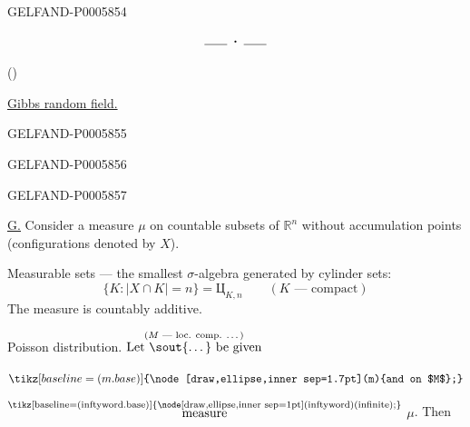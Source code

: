 \begin{GelfandAdjacentEvidence}{GELFAND-P000585}{4}

\[
\rule{1.8em}{.4pt}\;\boldsymbol{\cdot}\;\rule{1.8em}{.4pt}
\]

\qquad{}\quad()

\underline{Gibbs random field.}
\end{GelfandAdjacentEvidence}
\begin{GelfandAdjacentEvidence}{GELFAND-P000585}{5}

\end{GelfandAdjacentEvidence}
\begin{GelfandAdjacentEvidence}{GELFAND-P000585}{6}

\end{GelfandAdjacentEvidence}
\begin{GelfandAdjacentEvidence}{GELFAND-P000585}{7}


\underline{\underline{G.}} Consider a measure \(\mu\) on countable subsets of \(\mathbb R^n\)
without accumulation points (configurations denoted by \(X\)).

Measurable sets — the smallest \(\sigma\)-algebra generated by cylinder sets:
\[
\{K:\lvert X\cap K\rvert=n\}=\text{Ц}_{K,n}
\qquad(K\text{ — compact})
\]
The measure is countably additive.

 Poisson distribution.
\noindent\hfill\(\overset{\text{($M$ — loc. comp. \textellipsis{})}}%
{\text{Let \sout{\textellipsis{}} be given}}\)\par
\noindent\hfill\(\tikz[baseline=(m.base)]{\node[draw,ellipse,inner sep=1.7pt](m){and on $M$};}\)\par
\sout{\textellipsis{}}
\(\overset{\text{\tikz[baseline=(inftyword.base)]{\node[draw,ellipse,inner sep=1pt](inftyword){\scriptsize (infinite)};}}}
{\text{measure}}\)
\(\mu\). Then
\end{GelfandAdjacentEvidence}
